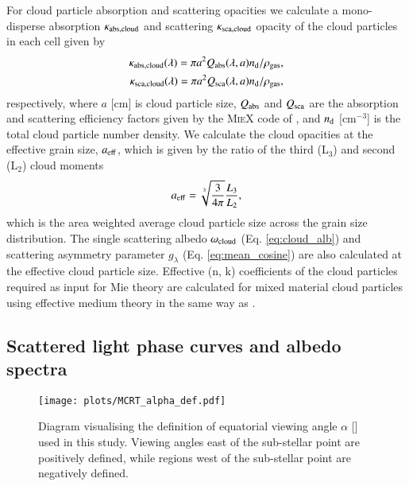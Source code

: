 \documentclass{aa}
\begin{document}
For cloud particle absorption and scattering opacities we calculate a mono-disperse absorption $\kappa_{\rm abs, cloud}$ and scattering $\kappa_{\rm sca, cloud}$ opacity of the cloud particles in each cell given by
\begin{eqnarray}
\label{eq:cloud_opc}
\kappa_{\rm abs, cloud}(\lambda) = \pi a^{2} Q_{\rm abs}(\lambda, a) n_{\rm d} / \rho_{\rm gas} , \nonumber \\
\kappa_{\rm sca, cloud}(\lambda) = \pi a^{2} Q_{\rm sca}(\lambda, a) n_{\rm d} / \rho_{\rm gas} ,
\end{eqnarray}
respectively, where $a$ [cm] is cloud particle size, $Q_{\rm abs}$ and $Q_{\rm sca}$ are the absorption and scattering efficiency factors given by the \textsc{MieX} code of \citet{Wolf2004}, and $n_{\rm d}$ [cm$^{-3}$] is the total cloud particle number density.
We calculate the cloud opacities at the effective grain size, $a_{\rm  eff}$, which is given by the ratio of the third (L$_{3}$) and second (L$_{2}$) cloud moments \citep{Hansen1974}
\begin{equation}
\label{eq:aeff}
a_{\rm eff} = \sqrt[3]{\frac{3}{4\pi}} \frac{L_{3}}{L_{2}}  ,
\end{equation}
which is the area weighted average cloud particle size across the grain size distribution.
The single scattering albedo $\omega_{\rm cloud}$ (Eq. \ref{eq:cloud_alb}) and scattering asymmetry parameter $g_{\lambda}$ (Eq. \ref{eq:mean_cosine}) are also calculated at the effective cloud particle size.
Effective (n, k) coefficients of the cloud particles required as input for Mie theory are calculated for mixed material cloud particles using effective medium theory in the same way as \citet{Lee2015b}.

\subsection{Scattered light phase curves and albedo spectra}

\begin{figure}
   \centering
   \texttt{[image: plots/MCRT\_alpha\_def.pdf]} 
   \caption{Diagram visualising the definition of equatorial viewing angle $\alpha$ [\degr] used in this study. Viewing angles east of the sub-stellar point are positively defined, while regions west of the sub-stellar point are negatively defined.}
   \label{fig:alpha_def}
\end{figure}
\end{document}
